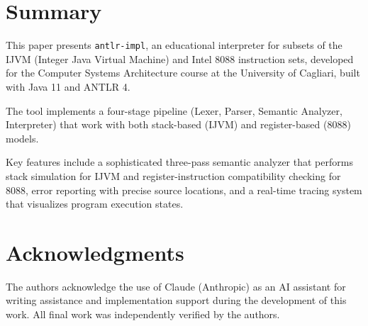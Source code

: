 \documentclass[11pt]{article}
\begin{document}
\section{Summary}
This paper presents \texttt{antlr-impl}, an educational interpreter for subsets of the IJVM (Integer Java Virtual Machine) and Intel 8088 instruction sets, developed for the Computer Systems Architecture course at the University of Cagliari, built with Java 11 and ANTLR 4.

The tool implements a four-stage pipeline (Lexer, Parser, Semantic Analyzer, Interpreter) that work with both stack-based (IJVM) and register-based (8088) models.

Key features include a sophisticated three-pass semantic analyzer that performs stack simulation for IJVM and register-instruction compatibility checking for 8088, error reporting with precise source locations, and a real-time tracing system that visualizes program execution states.

\section*{Acknowledgments}
The authors acknowledge the use of Claude (Anthropic) as an AI assistant for writing assistance and implementation support during the development of this work. All final work was independently verified by the authors.



\end{document}
